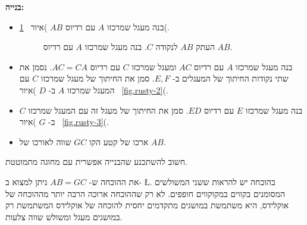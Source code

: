 \documentclass[12pt,a4paper]{article}
\begin{document}
\textbf{בנייה:}
\vspace*{-2ex}
\begin{itemize}
\item
בנה מעגל שמרכזו 
$A$
עם רדיוס
$AB$
)איור~
\ref{fig.rusty-1}(.

\begin{figure}[H]
\begin{center}
\caption{%
העתק
$AB$
לנקודה
$C$.
בנה מעגל שמרכזו
$A$
עם רדיוס
$AB$.%
}\label{fig.rusty-1}
\end{center}
\end{figure}

\item
בנה מעגל שמרכזו
$A$
עם רדיוס
$AC$
ומעגל שמרכזו
$C$
עם רדיוס
$AC=CA$.
נסמן את שתי נקודות החיתוך של המעגלים ב-%
$E,F$.
סמן את החיתוך של מעגל שמרכזו
$C$
עם המעגל שמרכזו
$A$
ב-%
$D$
)איור~%
\ref{fig.rusty-2}(.
\item
בנה מעגל שמרכזו 
$E$
עם רדיוס 
$ED$.
סמן את החיתוך של מעגל זה עם המעגל שמרכזו
$C$
ב-%
$G$
)איור~%
\ref{fig.rusty-3}(.
\item
ארכו של קטע הקו 
$GC$
שווה לאורכו של
$AB$.
\end{itemize}
חשוב להשתכנע שהבנייה אפשרית עם מחוגה מתמוטטת.

את ההוכחה ש-%
$AB=GC$
ניתן למצוא ב-%
\L{\cite{rusty}}.
בהוכחה יש להראות ששני המשולשים המסומנים בקווים במקוקווים חופפים. לא רק שההוכחה ארוכה הרבה יותר מההוכחה של אוקלידס, היא משתמשת במושגים מתקדמים יחסית להוכחה של אוקלידס המשתמשת רק במושגים מעגל ומשולש שווה צלעות.
\end{document}
